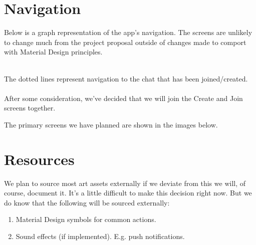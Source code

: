 \documentclass{article}
\begin{document}
\section{Navigation}

Below is a graph representation of the app's navigation. The screens are unlikely to change much from the project proposal outside of changes made to comport with Material Design principles.
\\\\

The dotted lines represent navigation to the chat that has been joined/created. \\ \\

After some consideration, we've decided that we will join the Create and Join screens together.

The primary screens we have planned are shown in the images below.

\begin{center}
\end{center}

\begin{center}
\end{center}

\section{Resources}

We plan to source most art assets externally if we deviate from this we will, of course, document it. It's a little difficult to make this decision right now. But we do know that the following will be sourced externally: 
\begin{enumerate}
    \item Material Design symbols for common actions.
    \item Sound effects (if implemented). E.g. push notifications.
\end{enumerate}
\end{document}
